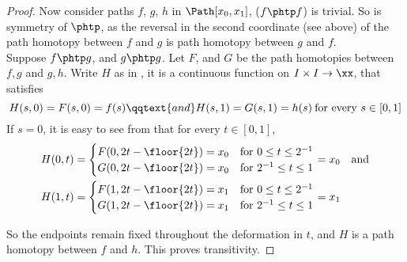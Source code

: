 \documentclass[../main-v2-manifolds.tex]{subfiles}
\begin{document}
\begin{proof}
    Now consider paths $f$, $g$, $h$ in $\Path[x_0,x_1]$, ($f\phtp f$) is trivial. So is symmetry of $\phtp$, as the reversal in the second coordinate (see above) of the path homotopy between $f$ and $g$ is path homotopy between $g$ and $f$.\\

    Suppose $f\phtp g$, and $g\phtp g$. Let $F$, and $G$ be the path homotopies between $f,g$ and $g,h$. Write $H$ as in , it is a continuous function on $I\times I\to \xx$, that satisfies
    \[
        H(s,0) = F(s,0) = f(s)\qqtext{and} H(s,1)=G(s,1)=h(s)\: \text{for every }s\in[0,1]
    \]
    If $s=0$, it is easy to see from  that for every $t\in[0,1]$, 
    \begin{align*}
        H(0,t)&=\begin{cases}
            F(0,2t-\floor{2t})=x_0 & \text{for } 0\leq t\leq 2^{-1}\\
            G(0,2t-\floor{2t})=x_0 & \text{for } 2^{-1}\leq t\leq 1\\
        \end{cases}=x_0\quad \text{and}\\
        H(1,t)&=\begin{cases}
            F(1,2t-\floor{2t})=x_1 & \text{for } 0\leq t\leq 2^{-1}\\
            G(1,2t-\floor{2t})=x_1 & \text{for } 2^{-1}\leq t\leq 1\\
        \end{cases}=x_1
    \end{align*}

    So the endpoints remain fixed throughout the deformation in $t$, and $H$ is a path homotopy between $f$ and $h$. This proves transitivity.
\end{proof}

\end{document}
